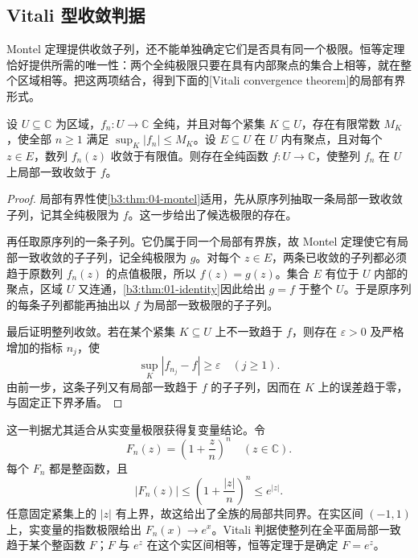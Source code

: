 \subsection{Vitali 型收敛判据}
\label{b3:subsec:040404}

Montel 定理提供收敛子列，还不能单独确定它们是否具有同一个极限。恒等定理恰好提供所需的唯一性：两个全纯极限只要在具有内部聚点的集合上相等，就在整个区域相等。把这两项结合，得到下面的[Vitali convergence theorem]的局部有界形式。

\begin{proposition}\label{b3:prop:04-vitali-bounded}
设 \(U\subseteq\mathbb C\) 为区域，\(f_n:U\rightarrow\mathbb C\) 全纯，并且对每个紧集 \(K\subseteq U\)，存在有限常数 \(M_K\)，使全部 \(n\ge1\) 满足 \(\sup_K|f_n|\le M_K\)。设 \(E\subseteq U\) 在 \(U\) 内有聚点，且对每个 \(z\in E\)，数列 \(f_n(z)\) 收敛于有限值。则存在全纯函数 \(f:U\rightarrow\mathbb C\)，使整列 \(f_n\) 在 \(U\) 上局部一致收敛于 \(f\)。
\end{proposition}
\begin{proof}
局部有界性使\cref{b3:thm:04-montel}适用，先从原序列抽取一条局部一致收敛子列，记其全纯极限为 \(f\)。这一步给出了候选极限的存在。

再任取原序列的一条子列。它仍属于同一个局部有界族，故 Montel 定理使它有局部一致收敛的子子列，记全纯极限为 \(g\)。对每个 \(z\in E\)，两条已收敛的子列都必须趋于原数列 \(f_n(z)\) 的点值极限，所以 \(f(z)=g(z)\)。集合 \(E\) 有位于 \(U\) 内部的聚点，区域 \(U\) 又连通，\cref{b3:thm:01-identity}因此给出 \(g=f\) 于整个 \(U\)。于是原序列的每条子列都能再抽出以 \(f\) 为局部一致极限的子子列。

最后证明整列收敛。若在某个紧集 \(K\subseteq U\) 上不一致趋于 \(f\)，则存在 \(\varepsilon>0\) 及严格增加的指标 \(n_j\)，使
\[
 \sup_K|f_{n_j}-f|\ge\varepsilon\quad(j\ge1).
\]
由前一步，这条子列又有局部一致趋于 \(f\) 的子子列，因而在 \(K\) 上的误差趋于零，与固定正下界矛盾。
\end{proof}

这一判据尤其适合从实变量极限获得复变量结论。令
\[
 F_n(z)=\left(1+\frac zn\right)^n\quad(z\in\mathbb C).
\]
每个 \(F_n\) 都是整函数，且
\[
 |F_n(z)|\le\left(1+\frac{|z|}{n}\right)^n\le e^{|z|}.
\]
任意固定紧集上的 \(|z|\) 有上界，故这给出了全族的局部共同界。在实区间 \((-1,1)\) 上，实变量的指数极限给出 \(F_n(x)\rightarrow e^x\)。Vitali 判据使整列在全平面局部一致趋于某个整函数 \(F\)；\(F\) 与 \(e^z\) 在这个实区间相等，恒等定理于是确定 \(F=e^z\)。

